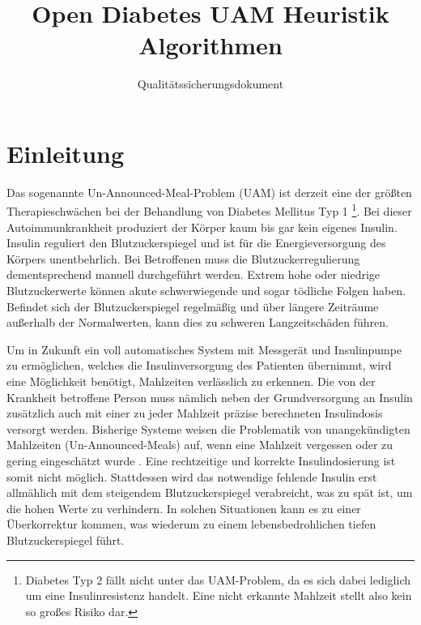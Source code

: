 \documentclass[accentcolor=tud0b,12pt,paper=a4]{tudreport}
\title{Open Diabetes UAM Heuristik Algorithmen}
\subtitle{Qualitätssicherungsdokument}
\begin{document}
	\maketitle
	\tableofcontents 
	
	\chapter{Einleitung}
Das sogenannte Un-Announced-Meal-Problem (UAM) ist derzeit eine der größten Therapieschwächen bei der Behandlung von Diabetes Mellitus Typ 1 \footnote{Diabetes Typ 2 fällt nicht unter das UAM-Problem, da es sich dabei lediglich um eine Insulinresistenz handelt. Eine nicht erkannte Mahlzeit stellt also kein so großes Risiko dar.}. Bei dieser Autoimmunkrankheit produziert der Körper kaum bis gar kein eigenes Insulin. Insulin reguliert den Blutzuckerspiegel und ist für die Energieversorgung des Körpers unentbehrlich. Bei Betroffenen muss die Blutzuckerregulierung dementsprechend  manuell durchgeführt werden. Extrem hohe oder niedrige Blutzuckerwerte können akute schwerwiegende und sogar tödliche Folgen haben. Befindet sich der Blutzuckerspiegel regelmäßig und über längere Zeiträume außerhalb der Normalwerten, kann dies zu schweren Langzeitschäden führen.

Um in Zukunft ein voll automatisches System mit Messgerät und Insulinpumpe zu ermöglichen, welches die Insulinversorgung des Patienten übernimmt, wird eine Möglichkeit benötigt, Mahlzeiten verlässlich zu erkennen. Die von der Krankheit betroffene Person muss nämlich neben der Grundversorgung an Insulin zusätzlich auch mit einer zu jeder Mahlzeit präzise berechneten Insulindosis versorgt werden. Bisherige Systeme weisen die Problematik von unangekündigten Mahlzeiten (Un-Announced-Meals) auf, wenn eine Mahlzeit vergessen oder zu gering eingeschätzt wurde . Eine rechtzeitige und korrekte Insulindosierung ist somit nicht möglich. Stattdessen wird das notwendige fehlende Insulin erst allmählich mit dem steigendem Blutzuckerspiegel  verabreicht, was zu spät ist, um die hohen Werte zu verhindern. In solchen Situationen kann es zu einer Überkorrektur kommen, was wiederum zu einem lebensbedrohlichen tiefen Blutzuckerspiegel führt. 
\end{document}
